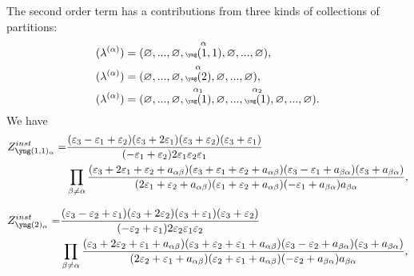 \documentclass[12pt]{article}
\numberwithin{equation}{section}
\theoremstyle{definition}
\begin{document}
The second order term has a contributions from three kinds of collections of partitions:
\begin{align*}
&(\lambda^{(\alpha)}) = (\varnothing, ..., \varnothing, \stackrel{\alpha}{\tiny\yng(1,1)}, \varnothing, ..., \varnothing), \\
&(\lambda^{(\alpha)}) = (\varnothing, ..., \varnothing, \stackrel{\alpha}{\tiny\yng(2)}, \varnothing, ..., \varnothing), \\
&(\lambda^{(\alpha)}) = (\varnothing, ..., \varnothing, \stackrel{\alpha_1}{\tiny\yng(1)}, \varnothing, ..., \stackrel{\alpha_2}{\tiny\yng(1)}, \varnothing,...,\varnothing).
\end{align*}
We have
\begin{align*}
Z^{inst}_{\fontsize{2.5}{4}\selectfont\yng(1,1)_{\alpha}} = &\frac{(\varepsilon_3 - \varepsilon_{1} + \varepsilon_{2})(\varepsilon_3 + 2\varepsilon_1 )(\varepsilon_3 + \varepsilon_2 )(\varepsilon_3 + \varepsilon_1 )}{(-\varepsilon_{1} + \varepsilon_{2})  2\varepsilon_1 \varepsilon_2 \varepsilon_1 }  \\
& \prod\limits_{\beta \neq \alpha} \frac{(\varepsilon_3 + 2\varepsilon_1 + \varepsilon_2 + a_{\alpha \beta})(\varepsilon_3 + \varepsilon_1 + \varepsilon_2 + a_{\alpha \beta})(\varepsilon_3 - \varepsilon_1 + a_{\beta \alpha})(\varepsilon_3 + a_{\beta \alpha})}{(2\varepsilon_1 + \varepsilon_2 + a_{\alpha \beta})(\varepsilon_1 + \varepsilon_2 + a_{\alpha \beta})(-\varepsilon_1 + a_{\beta \alpha}) a_{\beta \alpha}},
\end{align*}

\begin{align*}
Z^{inst}_{\fontsize{2.5}{4}\selectfont\yng(2)_{\alpha}} = &\frac{(\varepsilon_3 - \varepsilon_{2} + \varepsilon_{1})(\varepsilon_3 + 2\varepsilon_2 )(\varepsilon_3 + \varepsilon_1 )(\varepsilon_3 + \varepsilon_2 )}{(-\varepsilon_{2} + \varepsilon_{1})  2\varepsilon_2 \varepsilon_1 \varepsilon_2 }   \\
& \prod\limits_{\beta \neq \alpha} \frac{(\varepsilon_3 + 2\varepsilon_2 + \varepsilon_1 + a_{\alpha \beta})(\varepsilon_3 + \varepsilon_2 + \varepsilon_1 + a_{\alpha \beta})(\varepsilon_3 - \varepsilon_2 + a_{\beta \alpha})(\varepsilon_3 + a_{\beta \alpha})}{(2\varepsilon_2 + \varepsilon_1 + a_{\alpha \beta})(\varepsilon_2 + \varepsilon_1 + a_{\alpha \beta})(-\varepsilon_2 + a_{\beta \alpha}) a_{\beta \alpha}},
\end{align*}
\end{document}
